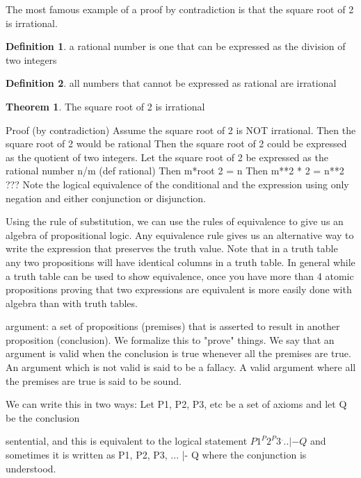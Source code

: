 \documentclass[11pt]{book} %
\theoremstyle {definition}
\newtheorem {definition}{Definition}[section]
\newtheorem {theorem}{Theorem}[section]
\theoremstyle {remark}
\begin{document}
The most famous example of a proof by contradiction is that the square root of 2 is irrational.

\begin {definition}
a rational number is one that can be expressed as the division of two integers
\end {definition}

\begin {definition}
all numbers that cannot be expressed as rational are irrational
\end {definition}

\begin {theorem}
The square root of 2 is irrational
\end {theorem}

Proof (by contradiction)
Assume the square root of 2 is NOT irrational.
Then the square root of 2 would be rational
Then the square root of 2 could be expressed as the quotient of two integers.
Let the square root of 2 be expressed as the rational number n/m (def rational)
Then m*root 2 = n
Then m**2 * 2 = n**2
???
    Note the logical equivalence of the conditional and the expression using only negation and either conjunction or disjunction.

Using the rule of substitution, we can use the rules of equivalence to give us an algebra of propositional logic. Any equivalence rule gives us an alternative way to write the expression that preserves the truth value. Note that in a truth table any two propositions will have identical columns in a truth table. In general while a truth table can be used to show equivalence, once you have more than 4 atomic propositions proving that two expressions are equivalent is more easily done with algebra than with truth tables.

argument: a set of propositions (premises) that is asserted to result in another proposition (conclusion). We formalize this to "prove" things. We say that an argument is valid when the conclusion is true whenever all the premises are true. An argument which is not valid is said to be a fallacy. A valid argument where all the premises are true is said to be sound.

We can write this in two ways:
Let P1, P2, P3, etc be a set of axioms and let Q be the conclusion

sentential, and this is equivalent to the logical statement
$P1 ^ P2 ^ P3^ ... |- Q$
and sometimes it is written as P1, P2, P3, ... |- Q where the conjunction is understood.
\end{document}
